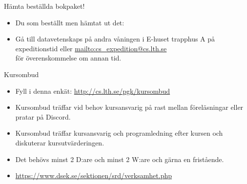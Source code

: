 
\ifkompendium\else
\begin{SlideExtra}{Hämta beställda bokpaket!}
  \begin{itemize}
    \item Du som beställt  men  hämtat ut det: \\
    \item[] Gå till datavetenskaps  på andra våningen i E-huset trapphus A på expeditionstid eller \url{mailto:cs_expedition@cs.lth.se} \\ för överenskommelse om annan tid. 
  \end{itemize}
\end{SlideExtra}


  
\begin{SlideExtra}{Kursombud}
\begin{itemize}
\item Fyll i denna enkät: \url{http://cs.lth.se/pgk/kursombud}
\item Kursombud träffar vid behov kursansvarig på rast mellan föreläsningar eller pratar på Discord.
\item Kursombud träffar kursansvarig och programledning efter kursen och diskuterar kursutvärderingen.
\item Det behövs minst 2 D:are och minst 2 W:are och gärna en fristående.
\item {\SlideFontSmall\url{https://www.dsek.se/sektionen/srd/verksamhet.php}}
\end{itemize}
\end{SlideExtra}
\fi
